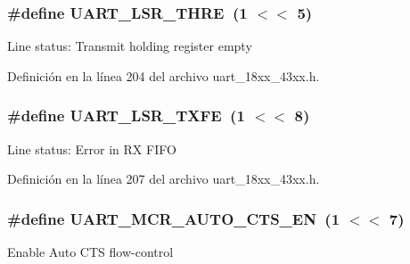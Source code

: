 \subsubsection[{\texorpdfstring{U\+A\+R\+T\+\_\+\+L\+S\+R\+\_\+\+T\+H\+RE}{UART_LSR_THRE}}]{\setlength{\rightskip}{0pt plus 5cm}\#define U\+A\+R\+T\+\_\+\+L\+S\+R\+\_\+\+T\+H\+RE~(1 $<$$<$ 5)}\hypertarget{group___u_a_r_t__18_x_x__43_x_x_gae05118527ef8873b9d7b1b0be0153019}{}\label{group___u_a_r_t__18_x_x__43_x_x_gae05118527ef8873b9d7b1b0be0153019}
Line status\+: Transmit holding register empty 

Definición en la línea 204 del archivo uart\+\_\+18xx\+\_\+43xx.\+h.

\subsubsection[{\texorpdfstring{U\+A\+R\+T\+\_\+\+L\+S\+R\+\_\+\+T\+X\+FE}{UART_LSR_TXFE}}]{\setlength{\rightskip}{0pt plus 5cm}\#define U\+A\+R\+T\+\_\+\+L\+S\+R\+\_\+\+T\+X\+FE~(1 $<$$<$ 8)}\hypertarget{group___u_a_r_t__18_x_x__43_x_x_ga1abf066d0f8b3400880a1909373cf699}{}\label{group___u_a_r_t__18_x_x__43_x_x_ga1abf066d0f8b3400880a1909373cf699}
Line status\+: Error in RX F\+I\+FO 

Definición en la línea 207 del archivo uart\+\_\+18xx\+\_\+43xx.\+h.

\subsubsection[{\texorpdfstring{U\+A\+R\+T\+\_\+\+M\+C\+R\+\_\+\+A\+U\+T\+O\+\_\+\+C\+T\+S\+\_\+\+EN}{UART_MCR_AUTO_CTS_EN}}]{\setlength{\rightskip}{0pt plus 5cm}\#define U\+A\+R\+T\+\_\+\+M\+C\+R\+\_\+\+A\+U\+T\+O\+\_\+\+C\+T\+S\+\_\+\+EN~(1 $<$$<$ 7)}\hypertarget{group___u_a_r_t__18_x_x__43_x_x_ga7769292aa692cb12dce90893fc992d2f}{}\label{group___u_a_r_t__18_x_x__43_x_x_ga7769292aa692cb12dce90893fc992d2f}
Enable Auto C\+TS flow-\/control 

